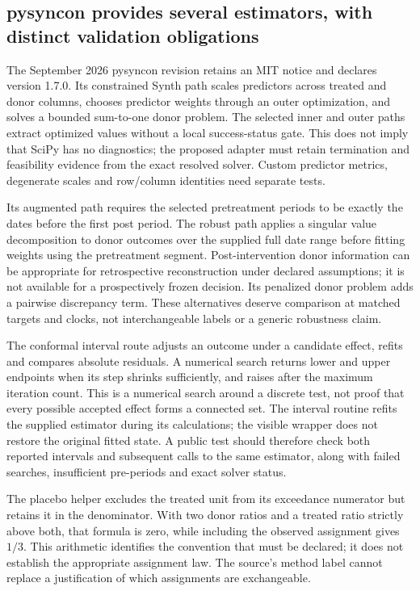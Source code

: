 \subsection{pysyncon provides several estimators, with distinct validation obligations}
The September 2026 pysyncon revision retains an MIT notice and declares
version 1.7.0. Its constrained Synth path scales predictors across treated
and donor columns, chooses predictor weights through an outer optimization,
and solves a bounded sum-to-one donor problem. The selected inner and outer
paths extract optimized values without a local success-status gate. This
does not imply that SciPy has no diagnostics; the proposed adapter must
retain termination and feasibility evidence from the exact resolved solver.
Custom predictor metrics, degenerate scales and row/column identities need
separate tests.\citep{exec25_synthpy_pysyncon}

Its augmented path requires the selected pretreatment periods to be exactly
the dates before the first post period. The robust path applies a singular
value decomposition to donor outcomes over the supplied full date range
before fitting weights using the pretreatment segment. Post-intervention
donor information can be appropriate for retrospective reconstruction under
declared assumptions; it is not available for a prospectively frozen
decision. Its penalized donor problem adds a pairwise discrepancy term.
These alternatives deserve comparison at matched targets and clocks, not
interchangeable labels or a generic robustness claim.
\citep{exec25_synthpy_pysyncon,exec25_synthpy_choice}

The conformal interval route adjusts an outcome under a candidate effect,
refits and compares absolute residuals. A numerical search returns lower
and upper endpoints when its step shrinks sufficiently, and raises after
the maximum iteration count. This is a numerical search around a discrete
test, not proof that every possible accepted effect forms a connected set.
The interval routine refits the supplied estimator during its calculations;
the visible wrapper does not restore the original fitted state. A public
test should therefore check both reported intervals and subsequent calls
to the same estimator, along with failed searches, insufficient pre-periods
and exact solver status.\citep{exec25_synthpy_pysyncon}

The placebo helper excludes the treated unit from its exceedance numerator
but retains it in the denominator. With two donor ratios and a treated
ratio strictly above both, that formula is zero, while including the
observed assignment gives $1/3$. This arithmetic identifies the convention
that must be declared; it does not establish the appropriate assignment
law. The source's method label cannot replace a justification of which
assignments are exchangeable.\citep{exec25_synthpy_pysyncon,
exec25_synthpy_choice}

